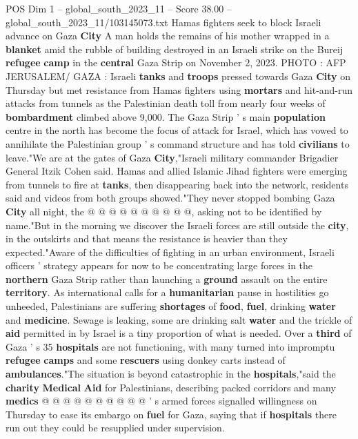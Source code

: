\begin{textsample}{POS Dim 1 – global\_south\_2023\_11 – Score 38.00 – global\_south\_2023\_11/103145073.txt}  \label{ex:f1_pos_124}
Hamas fighters seek to block Israeli advance on Gaza \textbf{City} A man holds the remains of his mother wrapped in a \textbf{blanket} amid the rubble of building destroyed in an Israeli strike on the Bureij \textbf{refugee} \textbf{camp} in the \textbf{central} Gaza Strip on November 2, 2023.
PHOTO : AFP JERUSALEM/ GAZA : Israeli \textbf{tanks} and \textbf{troops} pressed towards Gaza \textbf{City} on Thursday but met resistance from Hamas fighters using \textbf{mortars} and hit-and-run attacks from tunnels as the Palestinian death toll from nearly four weeks of \textbf{bombardment} climbed above 9,000.
The Gaza Strip ' s main \textbf{population} centre in the north has become the focus of attack for Israel, which has vowed to annihilate the Palestinian group ' s command structure and has told \textbf{civilians} to leave."We are at the gates of Gaza \textbf{City},"Israeli military commander Brigadier General Itzik Cohen said.
Hamas and allied Islamic Jihad fighters were emerging from tunnels to fire at \textbf{tanks}, then disappearing back into the network, residents said and videos from both groups showed."They never stopped bombing Gaza \textbf{City} all night, the @ @ @ @ @ @ @ @ @ @, asking not to be identified by name."But in the morning we discover the Israeli forces are still outside the \textbf{city}, in the outskirts and that means the resistance is heavier than they expected."Aware of the difficulties of fighting in an urban environment, Israeli officers ' strategy appears for now to be concentrating large forces in the \textbf{northern} Gaza Strip rather than launching a \textbf{ground} assault on the entire \textbf{territory}.
As international calls for a \textbf{humanitarian} pause in hostilities go unheeded, Palestinians are suffering \textbf{shortages} of \textbf{food}, \textbf{fuel}, drinking \textbf{water} and \textbf{medicine}.
Sewage is leaking, some are drinking salt \textbf{water} and the trickle of \textbf{aid} permitted in by Israel is a tiny proportion of what is needed.
Over a \textbf{third} of Gaza ' s 35 \textbf{hospitals} are not functioning, with many turned into impromptu \textbf{refugee} \textbf{camps} and some \textbf{rescuers} using donkey carts instead of \textbf{ambulances}."The situation is beyond catastrophic in the \textbf{hospitals},"said the \textbf{charity} \textbf{Medical} \textbf{Aid} for Palestinians, describing packed corridors and many \textbf{medics} @ @ @ @ @ @ @ @ @ @ ' s armed forces signalled willingness on Thursday to ease its embargo on \textbf{fuel} for Gaza, saying that if \textbf{hospitals} there run out they could be resupplied under supervision.

\end{textsample}
